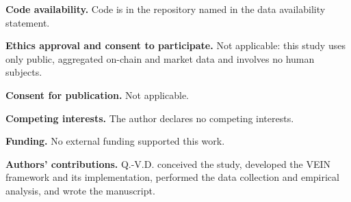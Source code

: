 \documentclass[referee,pdflatex,sn-mathphys-ay]{sn-jnl}
\theoremstyle{thmstyleone}%
\theoremstyle{thmstyletwo}%
\theoremstyle{thmstylethree}%
\begin{document}
\noindent\textbf{Code availability.} Code is in the repository named in the data availability statement.

\noindent\textbf{Ethics approval and consent to participate.} Not applicable: this study
uses only public, aggregated on-chain and market data and involves no human subjects.

\noindent\textbf{Consent for publication.} Not applicable.

\noindent\textbf{Competing interests.} The author declares no competing interests.

\noindent\textbf{Funding.} No external funding supported this work.

\noindent\textbf{Authors' contributions.} Q.-V.D. conceived the study, developed the VEIN
framework and its implementation, performed the data collection and empirical analysis,
and wrote the manuscript.
\end{document}
